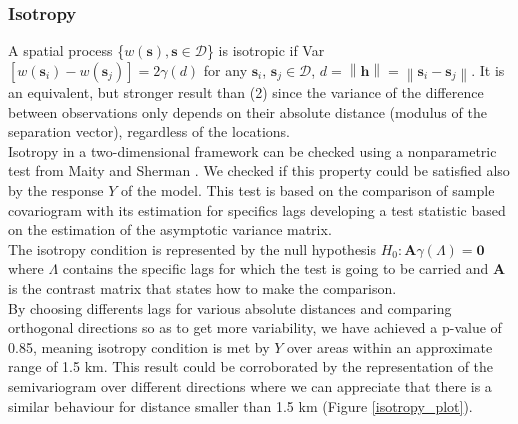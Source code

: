 \documentclass[12pt]{article}
\begin{document}
	
	
	\subsubsection{Isotropy}
	A spatial process \{$w(\boldsymbol{s}), \boldsymbol{s} \in \mathcal{D}$\} is isotropic if  Var$[w(\boldsymbol{s}_i)-w(\boldsymbol{s}_j)] = 2\gamma(d)$ \hspace{5 mm} for any $\boldsymbol{s}_i$, $\boldsymbol{s}_j \in \mathcal{D}$, $d =\left\lVert \mathbf{h} \right\rVert=\left\lVert \boldsymbol{s}_i-\boldsymbol{s}_j \right\rVert $. It is an equivalent, but stronger result than (2) since the variance of the difference between observations only depends on their absolute distance (modulus of the separation vector), regardless of the locations.\\

\noindent
	Isotropy in a two-dimensional framework can be checked using a nonparametric test from Maity and Sherman \cite{maity}. We checked if this property could be satisfied also by the response $Y$ of the model. This test is based on the comparison of sample covariogram with its estimation for specifics lags developing a test statistic based on the estimation of the asymptotic variance matrix.\\

\noindent
	The isotropy condition is represented by the null hypothesis  $H_0:\mathbf{A}\gamma(\Lambda)=\mathbf{0}$ where $\Lambda$ contains the specific lags for which the test is going to be carried and $\mathbf{A}$ is the contrast matrix that states how to make the comparison.\\

\noindent
	By choosing differents lags for various absolute distances and comparing orthogonal directions so as to get more variability, we have achieved a p-value of 0.85, meaning isotropy condition is met by $Y$ over areas within an approximate range of 1.5 km.
	This result could be corroborated by the representation of the semivariogram over different directions where we can appreciate that there is a similar behaviour for distance smaller than 1.5 km (Figure \ref{isotropy_plot}).
	
\end{document}
